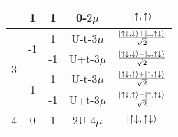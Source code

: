 \documentclass{article}
\begin{document}
\begin{table}[htb]
\begin{center}
\begin{tabular}{@{}ccccc@{}}
                                       & 1                   & 1  & 0-\(2\mu\)   & \(\ket{\uparrow,\uparrow}\) \\ \toprule
\multirow{4}{*}{3}                     & \multirow{2}{*}{-1} & 1  & U-t-\(3\mu\) & \(\frac{\ket{\uparrow\downarrow,\downarrow}+\ket{\downarrow,\uparrow\downarrow}}{\sqrt{2}}\) \\ \cmidrule(l){3-5} 
                                       &                     & -1 & U+t-\(3\mu\) & \(\frac{\ket{\uparrow\downarrow,\downarrow}-\ket{\downarrow,\uparrow\downarrow}}{\sqrt{2}}\) \\ \cmidrule(l){2-5}
                                       & \multirow{2}{*}{1}  & 1  & U-t-\(3\mu\) & \(\frac{\ket{\uparrow\downarrow,\uparrow}+\ket{\uparrow,\uparrow\downarrow}}{\sqrt{2}}\) \\ \cmidrule(l){3-5} 
                                       &                     & -1 & U+t-\(3\mu\) & \(\frac{\ket{\uparrow\downarrow,\uparrow}-\ket{\uparrow,\uparrow\downarrow}}{\sqrt{2}}\) \\ \toprule
4                                      & 0                   & 1  & 2U-\(4\mu\)  & \(\ket{\uparrow\downarrow,\uparrow\downarrow}\) \\
\toprule
\end{tabular}
\end{center}
\end{table}
\end{document}
